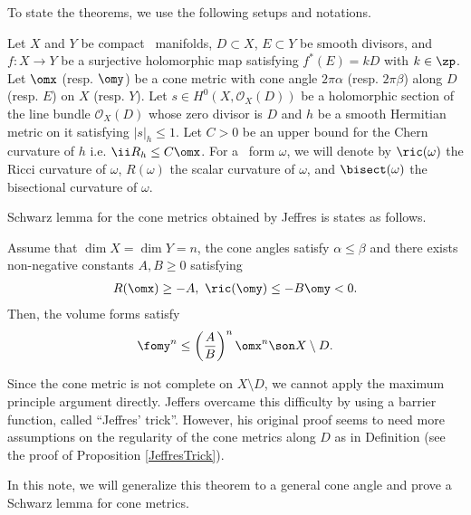 \documentclass[12pt]{amsart}
\begin{document}
To state the theorems, we use the following setups and notations. 
\begin{setups}
Let $X$ and $Y$ be compact \kahler \ manifolds, $D\subset X$, $E\subset Y$ be smooth divisors, and $f \colon X \rightarrow Y$ be a surjective holomorphic map satisfying $f^{\ast}(E) =k D$ with $k \in \zp$. 
Let $\omx$ (resp. $\omy$) be a cone metric with cone angle $2\pi \alpha $ (resp. $2\pi \beta$) along $D$ (resp. $E$) on $X$ (resp. $Y$). 
Let $s \in H^0(X, \mathcal{O}_X(D))$ be a holomorphic section of the line bundle $\mathcal{O}_X(D)$ whose zero divisor is $D$ and $h$ be a smooth Hermitian metric on it satisfying $|s|_h \le 1$. Let $C>0$ be  an upper bound for the Chern curvature of $h$ i.e.  $\ii R_h \le C \omx$. 
For a \kahler \ form $\omega$, we will denote by  
$\ric (\omega)$ the Ricci curvature of $\omega$, 
$R(\omega)$ the scalar curvature of $\omega$, 
and $\bisect(\omega)$ the bisectional curvature of $\omega$.
\end{setups}

Schwarz lemma for the cone metrics obtained by Jeffres \citep{Jeffres00} is states as follows. 
\begin{theorem}\label{JeffresVolumeThm}
Assume that  $\dim X = \dim Y = n$, the cone angles satisfy $\alpha \le \beta $ and there exists non-negative constants $A, B\ge  0$ satisfying
\begin{align}\label{CurvVolineq}
	R(\omx) \ge -A, \ \ric(\omy) \le -B \omy<0 .
\end{align} 
Then, the volume forms satisfy
\begin{align*}
	\fomy^n \le \left( \dfrac{A}{B} \right)^n \omx^n \son X\setminus D.
\end{align*}
\end{theorem}
Since the cone metric is not complete on $X \setminus D$, we cannot apply the maximum principle argument directly. Jeffers overcame this difficulty by using a barrier function, called ``Jeffres' trick''.  
However, his original proof seems to need more assumptions on the regularity of the cone metrics along $D$ as in Definition   (see the proof of Proposition \ref{JeffresTrick}).

In this note, we will generalize this theorem to a general cone angle and prove a Schwarz lemma for cone metrics.
\end{document}
